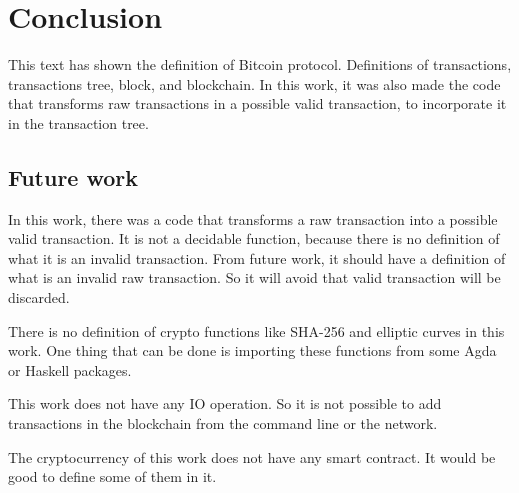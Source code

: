 \section{Conclusion}

This text has shown the definition of Bitcoin protocol.
Definitions of transactions, transactions tree, block, and blockchain.
In this work, it was also made the code that transforms raw transactions in a possible valid transaction,
to incorporate it in the transaction tree.

\subsection{Future work}

In this work, there was a code that transforms a raw transaction into a possible valid transaction.
It is not a decidable function, because there is no definition of what it is an invalid transaction.
From future work, it should have a definition of what is an invalid raw transaction.
So it will avoid that valid transaction will be discarded. 

There is no definition of crypto functions like SHA-256 and elliptic curves in this work.
One thing that can be done is importing these functions from some Agda or Haskell packages.

This work does not have any IO operation.
So it is not possible to add transactions in the blockchain from the command line or the network.

The cryptocurrency of this work does not have any smart contract.
It would be good to define some of them in it.
